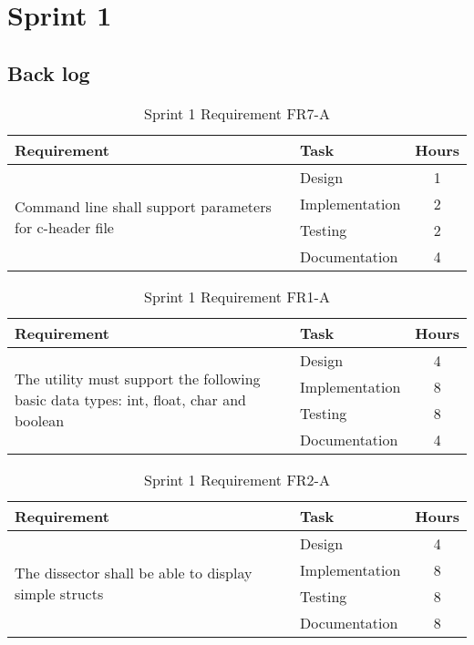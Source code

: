 \chapter{Sprint 1}

\section{Back log}
\begin{table}[ht] \small \center
\caption{Sprint 1 Requirement FR7-A}
\begin{tabular}{l l c}
	\toprule
	Requirement & Task & Hours \\
	\midrule
	\multirow{4}{5cm}{Command line shall support parameters for c-header file} & Design & 1 \\
	& Implementation & 2 \\
	& Testing & 2 \\
	& Documentation & 4 \\
	\bottomrule
\end{tabular}
\end{table}

\begin{table}[ht] \small \center
\caption{Sprint 1 Requirement FR1-A}
\begin{tabular}{l l c}
	\toprule
	Requirement & Task & Hours \\
	\midrule
	\multirow{4}{5cm}{The utility must support the following basic data types: int, float, char and boolean} & Design & 4 \\
	& Implementation & 8 \\
	& Testing & 8 \\
	& Documentation & 4 \\
	\bottomrule
\end{tabular}
\end{table}

\begin{table}[ht] \small \center
\caption{Sprint 1 Requirement FR2-A}
\begin{tabular}{l l c}
	\toprule
	Requirement & Task & Hours \\
	\midrule
	\multirow{4}{5cm}{The dissector shall be able to display simple structs} & Design & 4 \\
	& Implementation & 8 \\
	& Testing & 8 \\
	& Documentation & 8 \\
	\bottomrule
\end{tabular}
\end{table}

